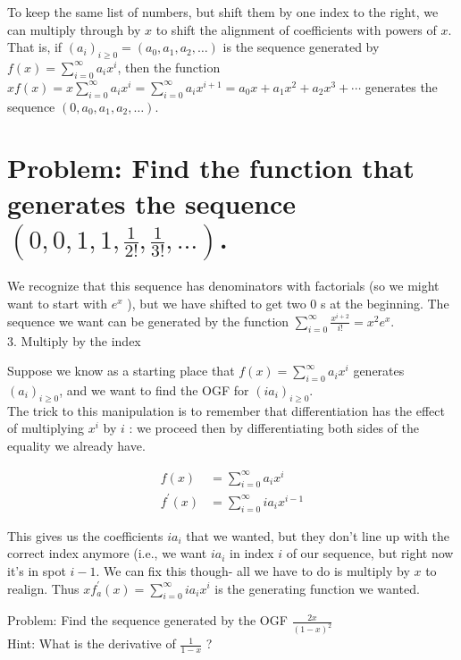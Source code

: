 \documentclass{article}
\begin{document}
To keep the same list of numbers, but shift them by one index to the right, we can multiply through by $x$ to shift the alignment of coefficients with powers of $x$.\\
That is, if $\left(a_{i}\right)_{i \geq 0}=\left(a_{0}, a_{1}, a_{2}, \ldots\right)$ is the sequence generated by $f(x)=\sum_{i=0}^{\infty} a_{i} x^{i}$, then the function $x f(x)=x \sum_{i=0}^{\infty} a_{i} x^{i}=\sum_{i=0}^{\infty} a_{i} x^{i+1}=a_{0} x+a_{1} x^{2}+a_{2} x^{3}+\cdots$ generates the sequence $\left(0, a_{0}, a_{1}, a_{2}, \ldots\right)$.

\section*{Problem: Find the function that generates the sequence $\left(0,0,1,1, \frac{1}{2!}, \frac{1}{3!}, \ldots\right)$.}
We recognize that this sequence has denominators with factorials (so we might want to start with $e^{x}$ ), but we have shifted to get two 0 s at the beginning. The sequence we want can be generated by the function $\sum_{i=0}^{\infty} \frac{x^{i+2}}{i!}=x^{2} e^{x}$.\\
3. Multiply by the index

Suppose we know as a starting place that $f(x)=\sum_{i=0}^{\infty} a_{i} x^{i}$ generates $\left(a_{i}\right)_{i \geq 0}$, and we want to find the OGF for $\left(i a_{i}\right)_{i \geq 0}$.\\
The trick to this manipulation is to remember that differentiation has the effect of multiplying $x^{i}$ by $i$ : we proceed then by differentiating both sides of the equality we already have.

$$
\begin{aligned}
f(x) & =\sum_{i=0}^{\infty} a_{i} x^{i} \\
f^{\prime}(x) & =\sum_{i=0}^{\infty} i a_{i} x^{i-1}
\end{aligned}
$$

This gives us the coefficients $i a_{i}$ that we wanted, but they don't line up with the correct index anymore (i.e., we want $i a_{i}$ in index $i$ of our sequence, but right now it's in spot $i-1$. We can fix this though- all we have to do is multiply by $x$ to realign. Thus $x f_{a}^{\prime}(x)=\sum_{i=0}^{\infty} i a_{i} x^{i}$ is the generating function we wanted.

Problem: Find the sequence generated by the OGF $\frac{2 x}{(1-x)^{2}}$\\
Hint: What is the derivative of $\frac{1}{1-x}$ ?
\end{document}
